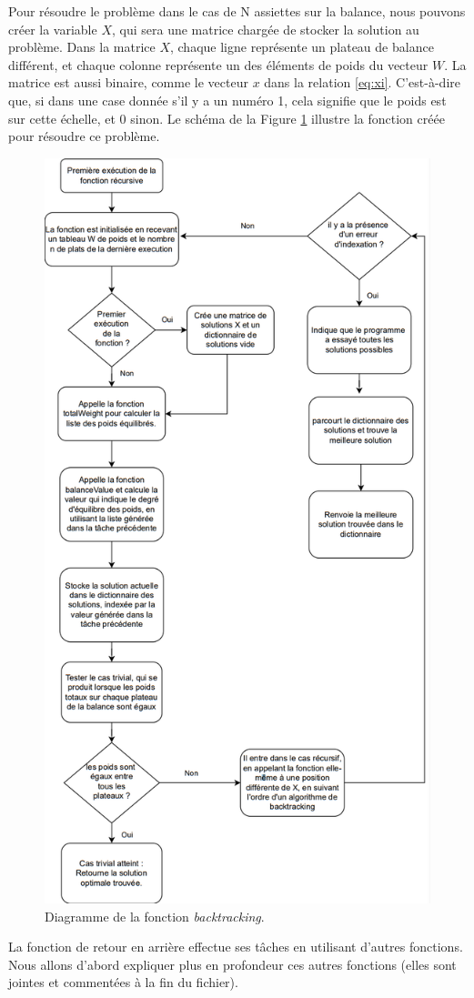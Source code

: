 \documentclass[12pt]{article} %
\begin{document}
Pour résoudre le problème dans le cas de N assiettes sur la balance, nous pouvons créer la variable $X$, qui sera une matrice chargée de stocker la solution au problème. Dans la matrice $X$, chaque ligne représente un plateau de balance différent, et chaque colonne représente un des éléments de poids du vecteur $W$. La matrice est aussi binaire, comme le vecteur $x$ dans la relation \ref{eq:xi}. C'est-à-dire que, si dans une case donnée s'il y a un numéro 1, cela signifie que le poids est sur cette échelle, et 0 sinon. Le schéma de la Figure \ref{fig:diagram} illustre la fonction créée pour résoudre ce problème. 

\FloatBarrier
\begin{figure}[!h]
\centering
\includegraphics[width = 0.67\linewidth]{diagram/diagrama.png}
\caption{Diagramme de la fonction \textit{backtracking}.}
\label{fig:diagram}
\end{figure}
\FloatBarrier

La fonction de retour en arrière effectue ses tâches en utilisant d'autres fonctions. Nous allons d'abord expliquer plus en profondeur ces autres fonctions (elles sont jointes et commentées à la fin du fichier).
\end{document}
